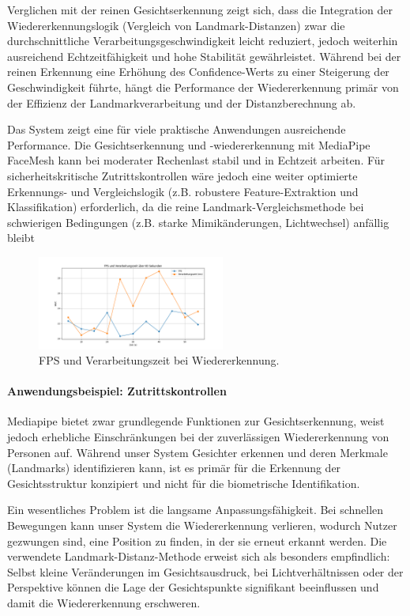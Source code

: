 Verglichen mit der reinen Gesichtserkennung zeigt sich, dass die Integration der Wiedererkennungslogik (Vergleich von Landmark-Distanzen) zwar die durchschnittliche Verarbeitungsgeschwindigkeit leicht reduziert, jedoch weiterhin ausreichend Echtzeitfähigkeit und hohe Stabilität gewährleistet. 
Während bei der reinen Erkennung eine Erhöhung des Confidence-Werts zu einer Steigerung der Geschwindigkeit führte, hängt die Performance der Wiedererkennung primär von der Effizienz der Landmarkverarbeitung und der Distanzberechnung ab.

Das System zeigt eine für viele praktische Anwendungen ausreichende Performance. Die Gesichtserkennung und -wiedererkennung mit MediaPipe FaceMesh kann bei moderater Rechenlast stabil und in Echtzeit arbeiten. 
Für sicherheitskritische Zutrittskontrollen wäre jedoch eine weiter optimierte Erkennungs- und Vergleichslogik (z.B. robustere Feature-Extraktion und Klassifikation) erforderlich, da die reine Landmark-Vergleichsmethode bei schwierigen Bedingungen (z.B. starke Mimikänderungen, Lichtwechsel) anfällig bleibt

\begin{figure}[ht]
    \centering
    \includegraphics[width=0.55\textwidth]{data/FPS_and_Processing_Time.png}
    \caption{FPS und Verarbeitungszeit bei Wiedererkennung.}
    \label{fig:fps_recognition_mediapipe}
\end{figure}


\paragraph{Anwendungsbeispiel: Zutrittskontrollen}

Mediapipe bietet zwar grundlegende Funktionen zur Gesichtserkennung, weist jedoch erhebliche Einschränkungen bei der zuverlässigen Wiedererkennung von Personen auf. 
Während unser System Gesichter erkennen und deren Merkmale (Landmarks) identifizieren kann, ist es primär für die Erkennung der Gesichtsstruktur konzipiert und nicht für die biometrische Identifikation.

Ein wesentliches Problem ist die langsame Anpassungsfähigkeit. Bei schnellen Bewegungen kann unser System die Wiedererkennung verlieren, wodurch Nutzer gezwungen sind, eine Position zu finden, in der sie erneut erkannt werden. 
Die verwendete Landmark-Distanz-Methode erweist sich als besonders empfindlich: Selbst kleine Veränderungen im Gesichtsausdruck, bei Lichtverhältnissen oder der Perspektive können die Lage der Gesichtspunkte signifikant beeinflussen und damit die Wiedererkennung erschweren.

